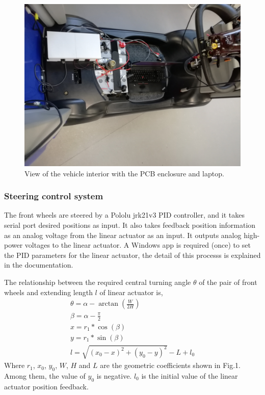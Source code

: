\documentclass[a4paper]{article}
\begin{document}
\begin{figure}
	\centering
	\includegraphics[width=0.7\columnwidth]{hardware/pcb_enclosure.jpg}
	\caption{View of the vehicle interior with the PCB enclosure and laptop.}
	\label{fig:pcb_enclosure}
\end{figure}



\subsubsection{Steering control system}

The front wheels are steered by a Pololu jrk21v3 PID controller, and it takes serial port desired positions as input. It also takes feedback position information as an analog voltage from the linear actuator as an input. It outputs analog high-power voltages to the linear actuator. A Windows app is required (once) to set the PID parameters for the linear actuator, the detail of this processs is explained in the documentation. 

The relationship between the required central turning angle $\theta$ of the pair of front wheels and extending length $l$ of linear actuator is,    
\begin{gather}
\theta = \alpha - \arctan(\frac{W}{2H}) \\
\beta = \alpha -\frac{\pi}{2}\\
x = r_1 * \cos(\beta) \\
y = r_1 * \sin(\beta) \\
l = \sqrt{(x_0-x)^2 + (y_0-y)^2} - L + l_0    
\end{gather}    
Where $r_1$, $x_0$, $y_0$, $W$, $H$ and $L$ are the geometric coefficients shown in Fig.1. Among them, the value of $y_0$ is negative. $l_0$ is the initial value of the linear actuator position feedback.
\end{document}
